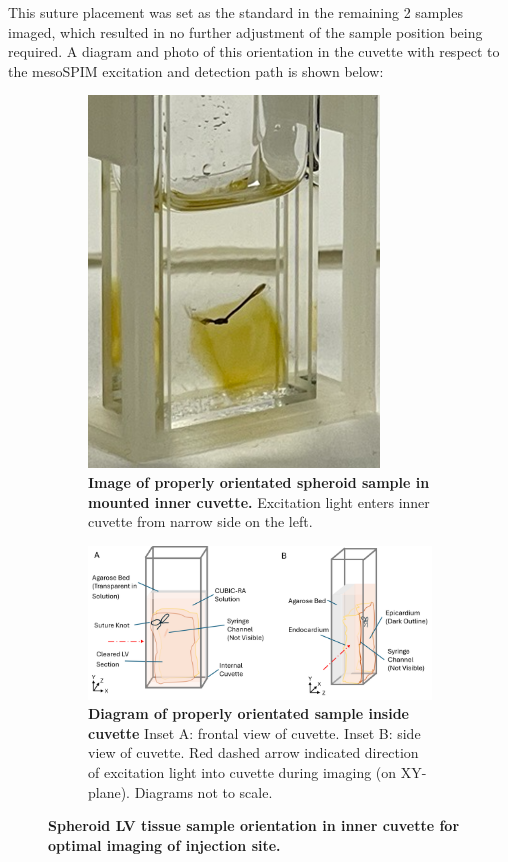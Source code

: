 This suture placement was set as the standard in the remaining 2 samples imaged, which resulted in no further adjustment of the sample position being required. A diagram and photo of this orientation in the cuvette with respect to the mesoSPIM excitation and detection path is shown below:

\begin{figure}[H]
\centering
    \begin{subfigure}[t]{0.75\textwidth}
    \centering
        \includegraphics[width=0.5\linewidth]{Images/Spheroid Orientation.png}
        \caption{\textbf{Image of properly orientated spheroid sample in mounted inner cuvette.} Excitation light enters inner cuvette from narrow side on the left.}
        \medskip
    \end{subfigure}
            
    \begin{subfigure}[t]{0.75\textwidth}
        \includegraphics[width=1\linewidth]{Figures/Spheroid OrientationDiagrams.png}
        \caption{\textbf{Diagram of properly orientated sample inside cuvette} Inset A: frontal view of cuvette. Inset B: side view of cuvette. Red dashed arrow indicated direction of excitation light into cuvette during imaging (on XY-plane). Diagrams not to scale.}
        \medskip
    \end{subfigure}    
    
\caption{\textbf{Spheroid LV tissue sample orientation in inner cuvette for optimal imaging of injection site.}} 
\label{fig:enter-label}
\end{figure}

